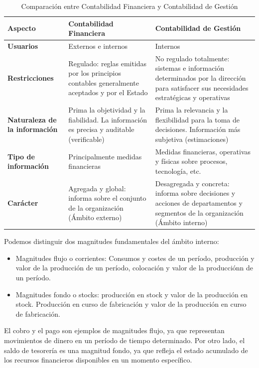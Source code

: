 \documentclass[12pt]{report} %
\providecommand{\tightlist}{%
  \setlength{\itemsep}{0pt}\setlength{\parskip}{0pt}}
\begin{document}
\begin{table}[H]
\centering
\begin{tabular}{|l|p{5cm}|p{5cm}|}
\hline
\textbf{Aspecto} & \textbf{Contabilidad Financiera} & \textbf{Contabilidad de Gestión} \\ \hline
\textbf{Usuarios} & Externos e internos & Internos \\ \hline
\textbf{Restricciones} & Regulado: reglas emitidas por los principios contables generalmente aceptados y por el Estado & No regulado totalmente: sistemas e información determinados por la dirección para satisfacer sus necesidades estratégicas y operativas \\ \hline
\textbf{Naturaleza de la información} & Prima la objetividad y la fiabilidad. La información es precisa y auditable (verificable) & Prima la relevancia y la flexibilidad para la toma de decisiones. Información más subjetiva (estimaciones) \\ \hline
\textbf{Tipo de información} & Principalmente medidas financieras & Medidas financieras, operativas y físicas sobre procesos, tecnología, etc. \\ \hline
\textbf{Carácter} & Agregada y global: informa sobre el conjunto de la organización (Ámbito externo) & Desagregada y concreta: informa sobre decisiones y acciones de departamentos y segmentos de la organización (Ámbito interno) \\ \hline
\end{tabular}
\caption{Comparación entre Contabilidad Financiera y Contabilidad de Gestión}
\end{table}

Podemos distinguir dos magnitudes fundamentales del ámbito interno:

\begin{itemize}
\tightlist
\item
  Magnitudes flujo o corrientes: Consumos y costes de un período,
  producción y valor de la producción de un período, colocación y valor
  de la producciónn de un período.
\item
  Magnitudes fondo o stocks: producción en stock y valor de la
  producción en stock. Producción en curso de fabricación y valor de la
  producción en curso de fabricación.
\end{itemize}

\begin{ejemplo}
El cobro y el pago son ejemplos de magnitudes flujo, ya que representan movimientos de dinero en un período de tiempo determinado. Por otro lado, el saldo de tesorería es una magnitud fondo, ya que refleja el estado acumulado de los recursos financieros disponibles en un momento específico.
\end{ejemplo}
\end{document}
